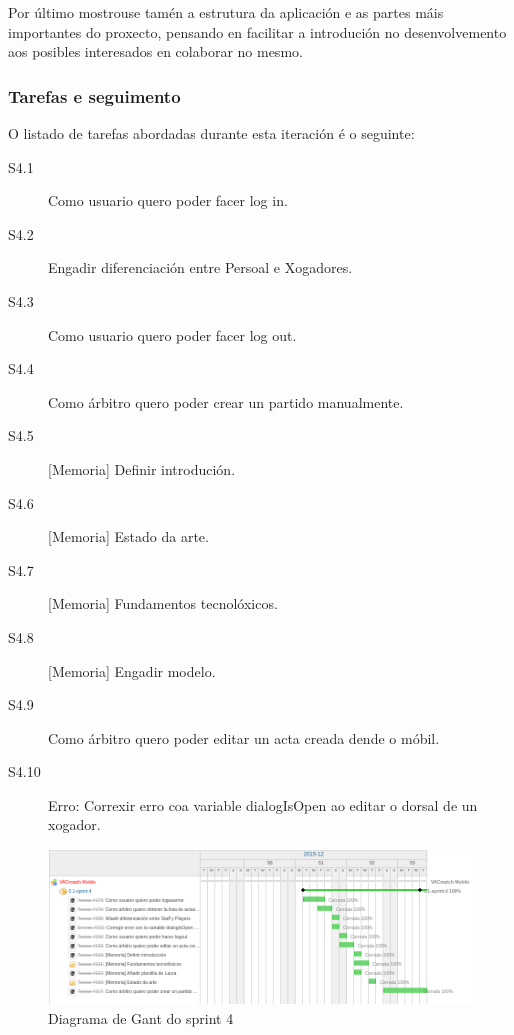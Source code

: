       Por último mostrouse tamén a estrutura da aplicación e as partes máis 
importantes do proxecto, pensando en facilitar a introdución no 
desenvolvemento aos posibles interesados en colaborar no mesmo.

      \subsubsection{Tarefas e seguimento}

      O listado de tarefas abordadas durante esta iteración é o seguinte:

        \begin{description}
          \item [S4.1] Como usuario quero poder facer log in.
          \item [S4.2] Engadir diferenciación entre Persoal e Xogadores.
          \item [S4.3] Como usuario quero poder facer log out.
          \item [S4.4] Como árbitro quero poder crear un partido manualmente.
          \item [S4.5] [Memoria] Definir introdución.
          \item [S4.6] [Memoria] Estado da arte.
          \item [S4.7] [Memoria] Fundamentos tecnolóxicos.
          \item [S4.8] [Memoria] Engadir modelo.
          \item [S4.9] Como árbitro quero poder editar un acta creada dende o 
móbil.
          \item [S4.10] Erro: Correxir erro coa variable dialogIsOpen ao editar 
o dorsal de un xogador.
        \end{description}

        \begin{figure}[h!]
          \begin{center}
          \includegraphics[width=\textwidth]{./img/gant_diagrams/04.png}
          \caption{Diagrama de Gant do sprint 4}
          \label{fig:gant04}
          \end{center}
        \end{figure}

